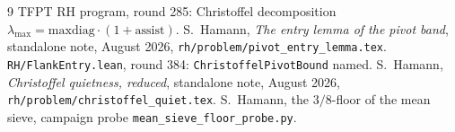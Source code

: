\documentclass[11pt]{article}
\theoremstyle{remark}
\begin{document}
\begin{thebibliography}{9}
TFPT RH program, round 285: Christoffel decomposition
$\lambda_{\max}=\mathrm{maxdiag}\cdot(1+\mathrm{assist})$.
S.~Hamann,
\textit{The entry lemma of the pivot band},
standalone note, August 2026,
\texttt{rh/problem/pivot\_entry\_lemma.tex}.
\texttt{RH/FlankEntry.lean}, round 384:
\texttt{ChristoffelPivotBound} named.
S.~Hamann,
\textit{Christoffel quietness, reduced},
standalone note, August 2026,
\texttt{rh/problem/christoffel\_quiet.tex}.
S.~Hamann,
the $3/8$-floor of the mean sieve,
campaign probe \texttt{mean\_sieve\_floor\_probe.py}.
\end{thebibliography}
\end{document}
